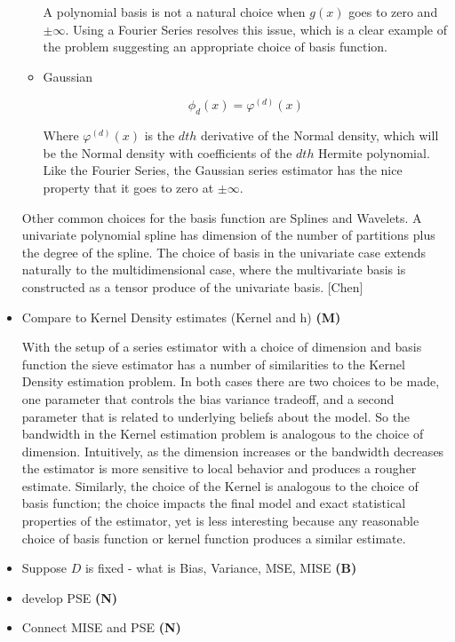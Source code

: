 \documentclass[12pt]{article}  %
\begin{document}
\begin{itemize}
\begin{itemize}
A polynomial basis is not a natural choice when $g(x)$ goes to zero and $\pm \infty$. Using a Fourier Series resolves this issue, which is a clear example of the problem suggesting an appropriate choice of basis function.

\item Gaussian 

$$  \phi_d(x) = \varphi^{(d)}(x)$$

Where $\varphi^{(d)}(x)$ is the $dth$ derivative of the Normal density, which will be the Normal density with coefficients  of the $dth$ Hermite polynomial. Like the Fourier Series, the Gaussian series estimator has the nice property that it goes to zero at $\pm \infty$.

\end{itemize}

Other common choices for the basis function are Splines and Wavelets. A univariate polynomial spline has dimension of the number of partitions plus the degree of the spline.  The choice of basis in the univariate case extends naturally to the multidimensional case, where the multivariate basis is constructed as a tensor produce of the univariate basis. [Chen]



\item Compare to Kernel Density estimates (Kernel and h) \textbf{(M)}

With the setup of a series estimator with a choice of dimension and basis function the sieve estimator has a number of similarities to the Kernel Density estimation problem.  In both cases there are two choices to be made, one parameter that controls the bias variance tradeoff, and a second parameter that is related to underlying beliefs about the model.  So the bandwidth in the Kernel estimation problem is analogous to the choice of dimension. Intuitively, as the dimension increases or the bandwidth decreases the estimator is more sensitive to local behavior and produces a rougher estimate. Similarly, the choice of the Kernel is analogous to the choice of basis function; the choice impacts the final model and exact statistical properties of the estimator, yet is less interesting because any reasonable choice of basis function or kernel function produces a similar estimate. 

\item Suppose $D$ is fixed - what is Bias, Variance, MSE, MISE \textbf{(B)}
\item develop PSE \textbf{(N)}
\item Connect MISE and PSE \textbf{(N)}
\end{itemize}
\end{document}
